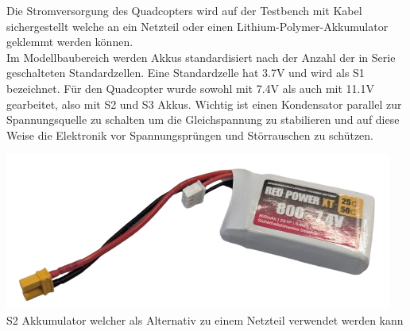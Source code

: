 \begin{center} 
\end{center}
Die Stromversorgung des Quadcopters wird auf der Testbench mit Kabel sichergestellt welche an ein Netzteil oder einen Lithium-Polymer-Akkumulator geklemmt werden können.\\
Im Modellbaubereich werden Akkus standardisiert nach der Anzahl der in Serie geschalteten Standardzellen. Eine Standardzelle hat 3.7V und wird als S1 bezeichnet. Für den Quadcopter wurde sowohl mit 7.4V als auch mit 11.1V gearbeitet, also mit S2 und S3 Akkus. Wichtig ist einen Kondensator parallel zur Spannungsquelle zu schalten um die Gleichspannung zu stabilieren und auf diese Weise die Elektronik vor Spannungsprüngen und Störrauschen zu 
schützen.
\begin{center}
	\includegraphics[scale=0.42]{../images/0082 S2 Akku.png}{\\\label{Akku}S2 Akkumulator welcher als Alternativ zu einem Netzteil verwendet werden kann}
\end{center}
